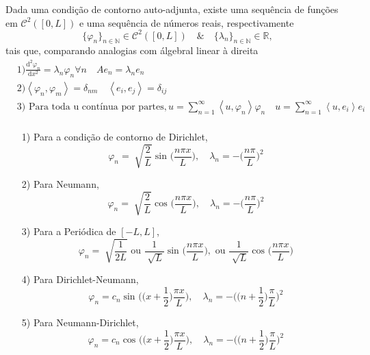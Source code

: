 \documentclass[../pde_notes.tex]{subfiles}
\begin{document}
\begin{theorem*}
	Dada uma condição de contorno auto-adjunta, existe uma sequência de funções em \(\mathcal{C}^{2}([0, L])\) e uma sequência de números reais, respectivamente
	\[
		\{\varphi_{n}\}_{n\in \mathbb{N}}\in \mathcal{C}^{2}([0, L])\quad\&\quad \{\lambda_{n}\}_{n\in \mathbb{N}}\in \mathbb{R},
	\]
	tais que, comparando analogias com álgebral linear à direita
	\begin{align*}
		 & 1) \frac{\mathrm{d}^{2}\varphi_{n}}{\mathrm{d}x^{2}} = \lambda_{n}\varphi_{n} \forall n                           \quad  Ae_{n} = \lambda_{n}e_{n}                                  \\
		 & 2) \left< \varphi_{n}, \varphi_{m} \right> = \delta_{nm}                                                          \quad  \left< e_{i}, e_{j} \right> = \delta_{ij}                  \\
		 & 3)\text{ Para toda u contínua por partes}, u = \sum\limits_{n=1}^{\infty}\left< u, \varphi_{n} \right>\varphi_{n} \quad  u = \sum\limits_{n=1}^{\infty}\left< u, e_{i} \right>e_{i} \\
	\end{align*}
\end{theorem*}
\begin{example}
	\begin{itemize}
		\item[1)]Para a condição de contorno de Dirichlet,
		      \[
			      \varphi_{n} = \sqrt[]{\frac{2}{L}}\sin^{}{\biggl(\frac{n\pi x}{L}\biggr)},\quad \lambda_{n} = -\biggl(\frac{n\pi }{L}\biggr)^{2}
		      \]
		\item[2)] Para Neumann,
		      \[
			      \varphi_{n} = \sqrt[]{\frac{2}{L}}\cos^{}{\biggl(\frac{n\pi x}{L}\biggr)},\quad \lambda_{n} = -\biggl(\frac{n\pi }{L}\biggr)^{2}
		      \]
		\item[3)] Para a Periódica de \([-L, L]\),
		      \[
			      \varphi_{n} = \sqrt[]{\frac{1}{2L}} \text{ ou }\frac{1}{\sqrt[]{L}}\sin^{}{\biggl(\frac{n\pi x}{L}\biggr)}, \text{ ou }\frac{1}{\sqrt[]{L}}\cos^{}{\biggl(\frac{n\pi x}{L}\biggr)}
		      \]
		\item[4)] Para Dirichlet-Neumann,
		      \[
			      \varphi_{n} = c_{n}\sin^{}{\biggl(\biggl(x+\frac{1}{2}\biggr)\frac{\pi x}{L}\biggr)},\quad \lambda_{n} = -\biggl(\biggl(n+\frac{1}{2}\biggr)\frac{\pi }{L}\biggr)^{2}
		      \]
		\item[5)] Para Neumann-Dirichlet,
		      \[
			      \varphi_{n} = c_{n}\cos^{}{\biggl(\biggl(x+\frac{1}{2}\biggr)\frac{\pi x}{L}\biggr)},\quad \lambda_{n} = -\biggl(\biggl(n+\frac{1}{2}\biggr)\frac{\pi }{L}\biggr)^{2}
		      \]
	\end{itemize}
\end{example}
\end{document}
